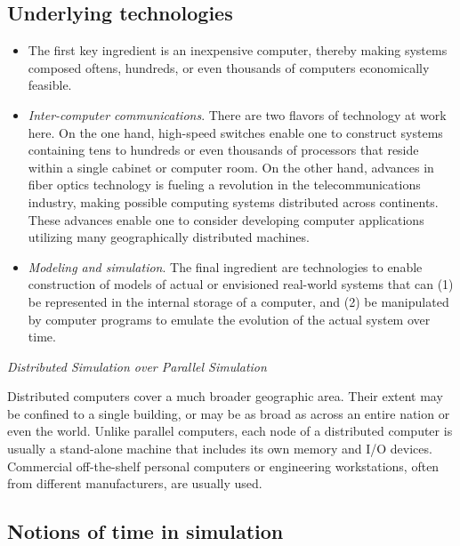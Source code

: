 \documentclass[12pt,a4paper]{article}
\begin{document}
	\subsection{Underlying technologies}
	
	\begin{itemize}
	\item The first key ingredient is an inexpensive computer, thereby making systems composed oftens, hundreds, or even thousands of computers economically feasible.
	\item \textit{Inter-computer communications}. There are two flavors of technology at work here. On the one hand, high-speed switches enable one to construct systems containing tens to hundreds or even thousands of processors that reside within a single cabinet or computer room. On the other hand, advances in fiber optics technology is fueling a revolution in the telecommunications industry, making possible computing systems distributed across continents. These advances enable one to consider developing computer applications utilizing many geographically distributed machines.
	\item \textit{Modeling and simulation}. The final ingredient are technologies to enable construction of models of actual or envisioned real-world systems that can (1) be represented in the internal storage of a computer, and (2) be manipulated by computer programs to emulate the evolution of the actual system over time.
	\end{itemize}
	
	\emph{Distributed Simulation over Parallel Simulation}
	
	Distributed computers cover a much broader geographic area. Their extent may be confined to a single building, or may be as broad as across an entire nation or even the world. Unlike parallel computers, each node of a distributed computer is usually a stand-alone machine that includes its own memory and I/O devices. Commercial off-the-shelf personal computers or engineering workstations, often from different manufacturers, are usually used.
	
	\subsection{Notions of time in simulation}
	
\end{document}
